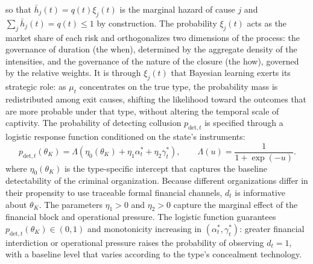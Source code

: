 \documentclass[ecta,nameyear,draft]{econsocart}
\theoremstyle{plain}
\theoremstyle{definition}
\newcommand{\1}{\mathbf{1}}
\begin{document}
so that $\bar h_j(t)=q(t)\xi_j(t)$ is the marginal hazard of cause $j$ and $\sum_j \bar h_j(t)=q(t)\leq 1$ by construction. The probability $\xi_j(t)$ acts as the market share of each risk and orthogonalizes two dimensions of the process: the governance of duration (the when), determined by the aggregate density of the intensities, and the governance of the nature of the closure (the how), governed by the relative weights. It is through $\xi_j(t)$ that Bayesian learning exerts its strategic role: as $\mu_t$ concentrates on the true type, the probability mass is redistributed among exit causes, shifting the likelihood toward the outcomes that are more probable under that type, without altering the temporal scale of captivity. The probability of detecting collusion $p_{\mathrm{det},t}$ is specified through a logistic response function conditioned on the state's instruments:
\begin{equation}
p_{\mathrm{det},t}(\theta_K)=\Lambda(\eta_0(\theta_K)+\eta_1\alpha_t^\ast+\eta_2\gamma_t^\ast),\qquad\Lambda(u)=\frac{1}{1+\exp(-u)}.
\label{eq:detection}
\end{equation}
where $\eta_0(\theta_K)$ is the type-specific intercept that captures the baseline detectability of the criminal organization. Because different organizations differ in their propensity to use traceable formal financial channels, $d_t$ is informative about $\theta_K$. The parameters $\eta_1>0$ and $\eta_2>0$ capture the marginal effect of the financial block and operational pressure. The logistic function guarantees $p_{\mathrm{det},t}(\theta_K)\in(0,1)$ and monotonicity increasing in $(\alpha_t^\ast,\gamma_t^\ast)$: greater financial interdiction or operational pressure raises the probability of observing $d_t=1$, with a baseline level that varies according to the type's concealment technology.
\end{document}
